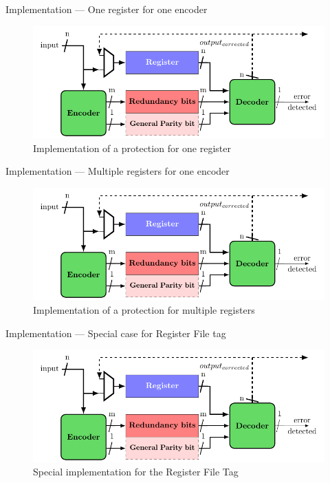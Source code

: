 \begin{frame}{Implementation — One register for one encoder}
    \begin{figure}
        \centering
        \includegraphics[width=.75\textwidth, page=1]{src/4_strategies/img/archi_contremesures.pdf}
        \caption{Implementation of a protection for one register}
        \label{fig:simple_parity_implem}
    \end{figure}
\end{frame}

\begin{frame}{Implementation — Multiple registers for one encoder}
    \begin{figure}
        \centering
        \includegraphics[width=.8\textwidth, page=4]{src/4_strategies/img/archi_contremesures.pdf}
        \caption{Implementation of a protection for multiple registers}
        \label{fig:secded_implem_independant_register}
    \end{figure}
\end{frame}

\begin{frame}{Implementation — Special case for Register File tag}
    \begin{figure}
        \centering
        \includegraphics[width=.9\textwidth, page=5]{src/4_strategies/img/archi_contremesures.pdf}
        \caption{Special implementation for the Register File Tag}
        \label{fig:secded_implem_rf}
    \end{figure}
\end{frame}


